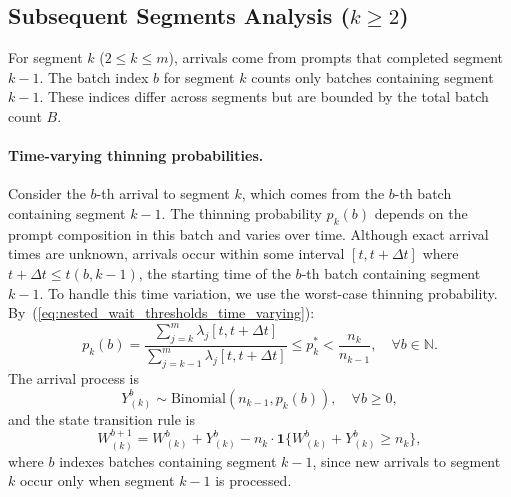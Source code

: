 \subsection{Subsequent Segments Analysis ($k \geq 2$)}

For segment $k$ ($2\leq k\leq m$), arrivals come from prompts that completed segment $k-1$. The batch index $b$ for segment $k$ counts only batches containing segment $k-1$. These indices differ across segments but are bounded by the total batch count $B$.

\paragraph{Time-varying thinning probabilities.} Consider the $b$-th arrival to segment $k$, which comes from the $b$-th batch containing segment $k-1$. The thinning probability $p_k(b)$ depends on the prompt composition in this batch and varies over time. Although exact arrival times are unknown, arrivals occur within some interval $[t, t+\Delta t]$ where $t+\Delta t \leq t(b,k-1)$, the starting time of the $b$-th batch containing segment $k-1$. To handle this time variation, we use the worst-case thinning probability. By~(\ref{eq:nested_wait_thresholds_time_varying}):
$$p_k(b) = \frac{\sum_{j=k}^m \lambda_j[ t, t+\Delta t ]}{\sum_{j=k-1}^m \lambda_j[ t, t+\Delta t ]}\leq p_k^* < \frac{n_k}{n_{k-1}}, \quad \forall b \in \mathbb{N}.$$
The arrival process is
$$Y_{(k)}^b \sim \text{Binomial}(n_{k-1},p_k(b)),\quad \forall b\geq 0,$$
and the state transition rule is
$$W_{(k)}^{b+1} = W_{(k)}^{b} + Y_{(k)}^{b} - n_k \cdot\mathbf{1}\{ W_{(k)}^{b} + Y_{(k)}^{b}\geq n_k \}, $$
where $b$ indexes batches containing segment $k-1$, since new arrivals to segment $k$ occur only when segment $k-1$ is processed.

